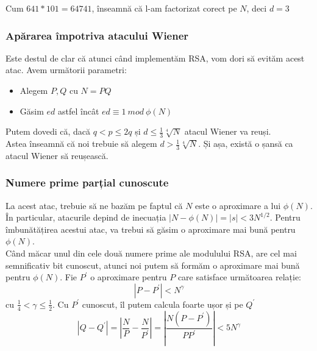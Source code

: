 \documentclass[12]{report}
\begin{document}
Cum $641 * 101 = 64741$, înseamnă că l-am factorizat corect pe $N$, deci $d=3$
\subsubsection{Apărarea împotriva atacului Wiener}
Este destul de clar că atunci când implementăm RSA, vom dori să evităm acest atac. Avem următorii parametri: \\
\begin{itemize}
\item Alegem $P,Q$ cu $N=PQ$

\item Găsim $ed$ astfel încât $ed \equiv 1 \ mod \ \phi(N)$

\end{itemize}
Putem dovedi că, dacă $q<p \leqslant 2q$ și $ d \leqslant \frac{1}{3} \sqrt[4]{N}$ atacul Wiener va reuși. \\
Astea înseamnă că noi trebuie să alegem $d > \frac{1}{3} \sqrt[4]{N}$. Și așa, există o șansă ca atacul Wiener să reușească.

\subsubsection{Numere prime parțial cunoscute}
La acest atac, trebuie să ne bazăm pe faptul că $N$ este o aproximare a lui $\phi(N)$. În particular, atacurile depind de inecuația $ | N-\phi(N)|=|s| < 3N^{1/2}$. Pentru îmbunătățirea acestui atac, va trebui să găsim o aproximare mai bună pentru $\phi(N)$. \\
Când măcar unul din cele două numere prime ale modulului RSA, are cel mai semnificativ bit cunoscut, atunci noi putem să formăm o aproximare mai bună pentru $\phi(N)$. Fie $P^{'}$ o aproximare pentru $P$ care satisface următoarea relație:
$$ |P - P^{'}| < N^{\gamma} $$
cu $ \frac{1}{4} < \gamma \leqslant \frac{1}{2} $. Cu $P^{'} $ cunoscut, îl putem calcula foarte ușor și pe $ Q^{'} $
$$ |Q - Q^{'} | = \left| \frac{N}{P} - \frac{N}{P^{'}} \right| = \left|\frac{N(P-P^{'})}{PP^{'}}\right| < 5 N^{\gamma} $$ 
\end{document}
